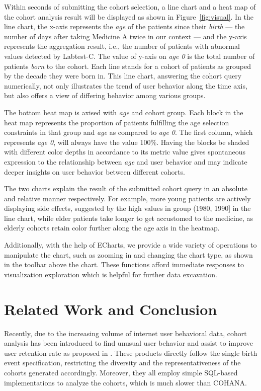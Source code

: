\documentclass[10pt,conference,letterpaper]{IEEEtran}
\begin{document}
Within seconds of submitting the cohort selection, a line chart and a heat map of the cohort analysis result will be displayed as shown in Figure~\ref{fig:visual}. In the line chart, the x-axis represents the \emph{age} of the patients since their \emph{birth} --- the number of days after taking Medicine A twice in our context --- and the y-axis represents the aggregation result, i.e., the number of patients with abnormal values detected by Labtest-C. The value of y-axis on \emph{age 0} is the total number of patients \emph{born} to the cohort. 
Each line stands for a cohort of patients as grouped by the decade they were born in. 
This line chart, answering the cohort query numerically, not only illustrates the trend of user behavior along the time axis, but also offers a view of differing behavior among various groups. 

The bottom heat map is axised with \emph{age} and cohort group. 
Each block in the heat map represents the proportion of patients fulfilling the age selection constraints in that group and \emph{age} as compared to \emph{age 0}. 
The first column, which represents \emph{age 0}, will always have the value 100\%. 
Having the blocks be shaded with different color depths in accordance to its metric value gives spontaneous expression to the relationship between \emph{age} and user behavior and may indicate deeper insights on user behavior between different cohorts. 

The two charts explain the result of the submitted cohort query in an absolute and relative manner respectively. For example, more young patients are actively displaying side effects, suggested by the high values in group (1980, 1990] in the line chart, while elder patients take longer to get accustomed to the medicine, as elderly cohorts retain color further along the age axis in the heatmap.

Additionally, with the help of ECharts\cite{echarts}, we provide a wide variety of operations to manipulate the chart, such as zooming in and changing the chart type, as shown in the toolbar above the chart. These functions afford immediate responses to visualization exploration which is helpful for further data excavation.

\section{Related Work and Conclusion}

Recently, due to the increasing volume of internet user behavioral data, cohort
analysis has been introduced to find unusual user behavior and assist to
improve user retention rate as proposed in \cite{amplitude, mixpanel, rjmetrics}. These
products directly follow the single birth event specification, restricting the diversity and the representativeness of the cohorts generated accordingly.
Moreover, they all employ simple SQL-based implementations to analyze the cohorts, which is much slower than COHANA.
\end{document}

